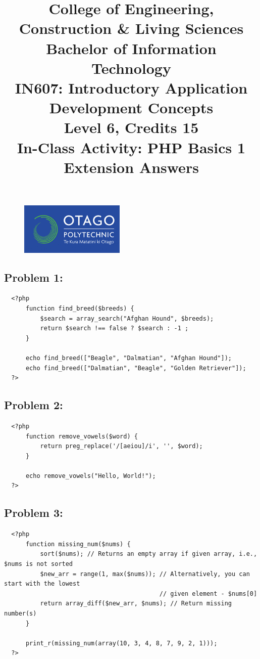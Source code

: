 \documentclass{article}
\author{}
\begin{document}
\begin{figure}
    \centering
    \includegraphics[width=50mm]{../img/logo.png}
\end{figure}

\title{College of Engineering, Construction \& Living Sciences\\Bachelor of Information Technology\\IN607: Introductory Application Development Concepts\\Level 6, Credits 15\\\textbf{In-Class Activity: PHP Basics 1 Extension Answers}}
\date{}
\maketitle
 
\subsection*{Problem 1:} 
\begin{verbatim}
  <?php
      function find_breed($breeds) {
          $search = array_search("Afghan Hound", $breeds);
          return $search !== false ? $search : -1 ;	
      }

      echo find_breed(["Beagle", "Dalmatian", "Afghan Hound"]);
      echo find_breed(["Dalmatian", "Beagle", "Golden Retriever"]);
  ?>
\end{verbatim}

\subsection*{Problem 2:} 
\begin{verbatim}
  <?php
      function remove_vowels($word) {
          return preg_replace('/[aeiou]/i', '', $word);
      }

      echo remove_vowels("Hello, World!");
  ?>
\end{verbatim}

\subsection*{Problem 3:} 
\begin{verbatim}
  <?php
      function missing_num($nums) {
          sort($nums); // Returns an empty array if given array, i.e., $nums is not sorted
          $new_arr = range(1, max($nums)); // Alternatively, you can start with the lowest 
                                           // given element - $nums[0]                                                
          return array_diff($new_arr, $nums); // Return missing number(s)
      }
        
      print_r(missing_num(array(10, 3, 4, 8, 7, 9, 2, 1)));
  ?>
\end{verbatim}
\end{document}
